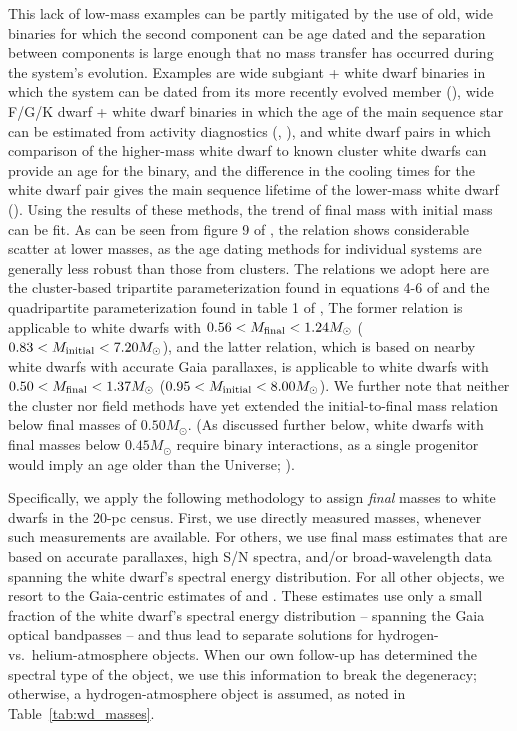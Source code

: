 \documentclass[twocolumn,tighten,twocolappendix]{aastex631}
\begin{document}
This lack of low-mass examples can be partly mitigated by the use of old, wide binaries for which the second component can be age dated and the separation between components is large enough that no mass transfer has occurred during the system's evolution. Examples are wide subgiant + white dwarf binaries in which the system can be dated from its more recently evolved member (\citealt{barrientos2021}), wide F/G/K dwarf + white dwarf binaries in which the age of the main sequence star can be estimated from activity diagnostics (\citealt{catalan2008}, \citealt{zhao2012}), and white dwarf pairs in which comparison of the higher-mass white dwarf to known cluster white dwarfs can provide an age for the binary, and the difference in the cooling times for the white dwarf pair gives the main sequence lifetime of the lower-mass white dwarf (\citealt{andrews2015}). Using the results of these methods, the trend of final mass with initial mass can be fit. As can be seen from figure 9 of \cite{barrientos2021}, the relation shows considerable scatter at lower masses, as the age dating methods for individual systems are generally less robust than those from clusters. The relations we adopt here are the cluster-based tripartite parameterization found in equations 4-6 of \cite{cummings2018} and the quadripartite parameterization found in table 1 of \cite{elbadry2018}, 
The former relation is applicable to white dwarfs with $0.56 < M_{\rm final} < 1.24 M_\odot$ ($0.83 < M_{\rm initial} < 7.20 M_\odot$), and the latter relation, which is
based on nearby white dwarfs with accurate Gaia parallaxes, is applicable to white dwarfs with  $0.50 < M_{\rm final} < 1.37 M_\odot$ ($0.95 < M_{\rm initial} < 8.00 M_\odot$). 
We further note that neither the cluster nor field methods have yet extended the initial-to-final mass relation below final masses of $0.50 M_\odot$. (As discussed further below, white dwarfs with final masses below $0.45 M_\odot$ require binary interactions, as a single progenitor would imply an age older than the Universe; \citealt{marsh1995}).

Specifically, we apply the following methodology to assign {\it final} masses to white dwarfs in the 20-pc census. First, we use directly measured masses, whenever such measurements are available. For others, we use final mass estimates that are based on accurate parallaxes, high S/N spectra, and/or broad-wavelength data spanning the white dwarf's spectral energy distribution. For all other objects, we resort to the Gaia-centric estimates of \cite{gentile2021} and \cite{gentilefusillo2019}. These estimates use only a small fraction of the white dwarf's spectral energy distribution -- spanning the Gaia optical bandpasses -- and thus lead to separate solutions for hydrogen- vs.\ helium-atmosphere objects. When our own follow-up has determined the spectral type of the object, we use this information to break the degeneracy; otherwise, a hydrogen-atmosphere object is assumed, as noted in Table~\ref{tab:wd_masses}.
\end{document}
